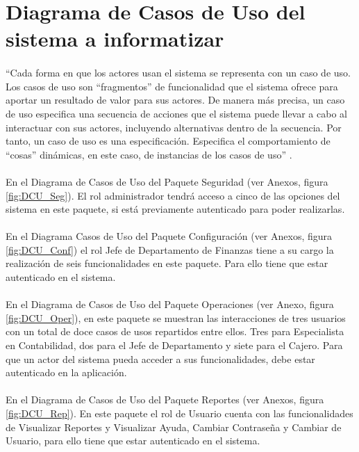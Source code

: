 \section{Diagrama de Casos de Uso del sistema a informatizar}
\paragraph{}“Cada forma en que los actores usan el sistema se representa con un caso de uso. Los casos de uso son “fragmentos” de funcionalidad que el sistema ofrece para aportar un resultado de valor para sus actores. De manera más precisa, un caso de uso especifica una secuencia de acciones que el sistema puede llevar a cabo al interactuar con sus actores, incluyendo alternativas dentro de la secuencia. Por tanto, un caso de uso es una especificación. Especifica el comportamiento de “cosas” dinámicas, en este caso, de instancias de los casos de uso” \cite{goran_v._rational_2007}.
\paragraph{}En el Diagrama de Casos de Uso del Paquete Seguridad (ver Anexos, figura \ref{fig:DCU_Seg}). El rol administrador tendrá acceso a cinco de las opciones del sistema en este paquete, si está previamente autenticado para poder realizarlas.
\paragraph{}En el Diagrama Casos de Uso del Paquete Configuración (ver Anexos, figura \ref{fig:DCU_Conf}) el rol Jefe de Departamento de Finanzas tiene a su cargo la realización de seis funcionalidades en este paquete. Para ello tiene que estar autenticado en el sistema. 
\paragraph{}En el Diagrama de Casos de Uso del Paquete Operaciones (ver Anexo, figura \ref{fig:DCU_Oper}), en este paquete se muestran las interacciones de tres usuarios con un total de doce casos de usos repartidos entre ellos. Tres para Especialista en Contabilidad, dos para el Jefe de Departamento y siete para el Cajero. Para que un actor del sistema pueda acceder a sus funcionalidades, debe estar autenticado en la aplicación.
\paragraph{}En el Diagrama de Casos de Uso del Paquete Reportes (ver Anexos, figura \ref{fig:DCU_Rep}). En este paquete el rol de Usuario cuenta con las funcionalidades de Visualizar Reportes y Visualizar Ayuda, Cambiar Contraseña y Cambiar de Usuario, para ello tiene que estar autenticado en el sistema.

